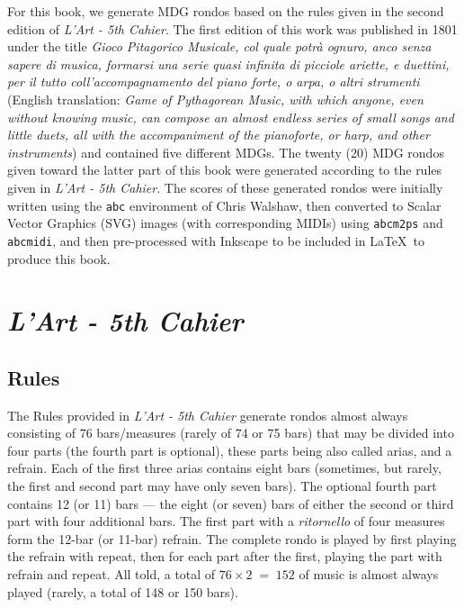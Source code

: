 \documentclass[a4paper,x11names,svgnames,10pt]{article}
\begin{document}
{For this book, we generate MDG rondos based on the rules given in the second edition of {\it L'Art - 5th Cahier}.  The first edition of this work was published in 1801 under the title {\it Gioco Pitagorico Musicale, col quale potrà ognuro, anco senza sapere di musica, formarsi una serie quasi infinita di picciole ariette, e duettini, per il tutto coll'accompagnamento del piano forte, o arpa, o altri strumenti} (English translation: {\em Game of Pythagorean Music, with which anyone, even without knowing music, can compose an almost endless series of small songs and little duets, all with the accompaniment of the pianoforte, or harp, and other instruments}) and contained five different MDGs.  The twenty (20) MDG rondos given toward the latter part of this book were generated according to the rules given in {\it L'Art - 5th Cahier}. The scores of these generated rondos were initially written using the \texttt{abc} environment of Chris Walshaw, then converted to Scalar Vector Graphics (SVG) images (with corresponding MIDIs) using {\tt abcm2ps} and {\tt abcmidi}, and then pre-processed with Inkscape to be included in \LaTeX\ to produce this book.


\section{\em L'Art - 5th Cahier}

\subsection{Rules}\label{mdgRules}

The Rules provided in {\it L'Art - 5th Cahier} generate rondos almost always consisting of 76 bars/measures (rarely of 74 or 75 bars) that may be divided into four parts (the fourth part is optional), these parts being also called arias, and a refrain.  Each of the first three arias contains eight bars (sometimes, but rarely, the first and second part may have only seven bars).  The optional fourth part contains 12 (or 11) bars --- the eight (or seven) bars of either the second or third part with four additional bars.  The first part with a {\it ritornello} of four measures form the 12-bar (or 11-bar) refrain. The complete rondo is played by first playing the refrain with repeat, then for each part after the first, playing the part with refrain and repeat. All told, a total of $76 \times 2 \;=\; 152$ of music is almost always played (rarely, a total of 148 or 150 bars). \\

}
\end{document}
